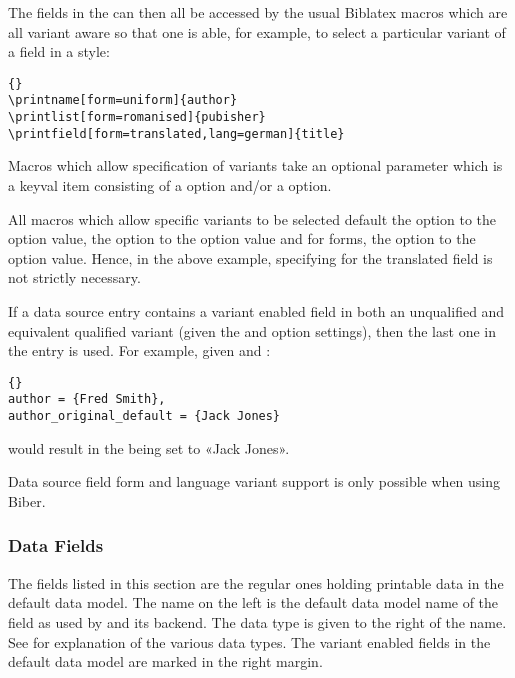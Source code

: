 \documentclass{ltxdockit}[2011/03/25]
\newcommand*{\biber}{Biber\xspace}
\newcommand*{\biblatex}{Biblatex\xspace}
\begin{document}
The fields in the  can then all be accessed by the usual \biblatex macros which are all variant aware so that one is able, for example, to select a particular variant of a field in a style:
\begin{lstlisting}[style=latex]{}
\printname[form=uniform]{author}
\printlist[form=romanised]{pubisher}
\printfield[form=translated,lang=german]{title}
\end{lstlisting}
%
Macros which allow specification of variants take an optional  parameter which is a keyval item consisting of a  option and/or a  option.

All macros which allow specific variants to be selected default the  option to the  option value, the  option to the  option value and for  forms, the  option to the  option value. Hence, in the above example, specifying  for the translated  field is not strictly necessary.

If a data source entry contains a variant enabled field in both an unqualified and equivalent qualified variant (given the  and  option settings), then the last one in the entry is used. For example, given  and :

\begin{lstlisting}[style=bibtex]{}
author = {Fred Smith},
author_original_default = {Jack Jones}
\end{lstlisting}
%
would result in the  being set to «Jack Jones».

Data source field form and language variant support is only possible when using \biber.

\subsubsection{Data Fields}
\label{bib:fld:dat}

The fields listed in this section are the regular ones holding printable data in the default data model. The name on the left is the default data model name of the field as used by  and its backend. The  data type is given to the right of the name. See  for explanation of the various data types. The variant enabled fields in the default data model are marked in the right margin.
\end{document}
